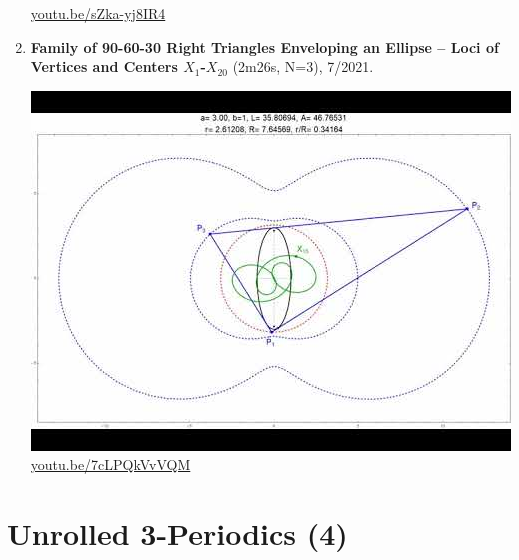 \documentclass[12pt]{amsart}
\begin{document}
\begin{enumerate}[resume]
\begin{center}
\href{https://youtu.be/sZka-yj8IR4}{\url{youtu.be/sZka-yj8IR4}}\end{center}
% 
\item \textbf{Family of 90-60-30 Right Triangles Enveloping an Ellipse -- Loci of Vertices and Centers $X_{1}$-$X_{20}$} (2m26s, N=3), 7/2021. 
\begin{center}\includegraphics[width=.5\textwidth]{pics/7cLPQkVvVQM.jpg} \\ 
\href{https://youtu.be/7cLPQkVvVQM}{\url{youtu.be/7cLPQkVvVQM}}\end{center}
% 
\end{enumerate}

\section{Unrolled 3-Periodics (4)}
\end{document}
